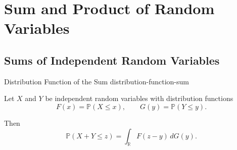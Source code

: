 \section{Sum and Product of Random Variables}


\subsection{Sums of Independent Random Variables}

\begin{theorem}{Distribution Function of the Sum}
{distribution-function-sum}

Let $X$ and $Y$ be independent random variables with distribution
functions
\[
F(x)=\mathbb{P}(X\leq x),
\qquad
G(y)=\mathbb{P}(Y\leq y).
\]

Then
\[
\boxed{
\mathbb{P}(X+Y\leq z)
=
\int_{\mathbb{R}}F(z-y)\,dG(y).
}
\]

\end{theorem}

